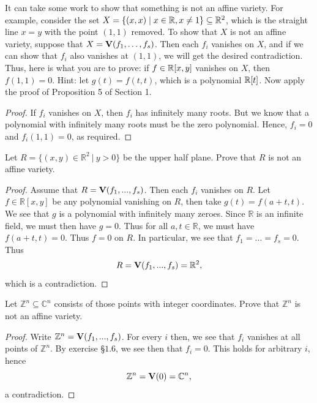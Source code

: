 \begin{exercise}{8}
It can take some work to show that something is not an affine variety. For example, consider the set $X=\{(x,x)\mid x\in\mathbb{R}, x\neq 1\}\subseteq\mathbb{R}^2$, which is the straight line $x=y$ with the point $(1,1)$ removed. To show that $X$ is not an affine variety, suppose that $X=\mathbf{V}(f_1,\dots,f_s)$. Then each $f_i$ vanishes on $X$, and if we can show that $f_i$ also vanishes at $(1,1)$, we will get the desired contradiction. Thus, here is what you are to prove: if $f\in\mathbb{R}[x,y]$ vanishes on $X$, then $f(1,1)=0$. Hint: let $g(t)=f(t,t)$, which is a polynomial $\mathbb{R}[t]$. Now apply the proof of Proposition 5 of Section 1.
\end{exercise}
\begin{proof}
 If $f_i$ vanishes on $X$, then $f_i$ has infinitely many roots. But we know that a polynomial with infinitely many roots must be the zero polynomial. Hence, $f_i=0$ and $f_i(1,1)=0$, as required.
\end{proof}

\begin{exercise}{9}
Let $R = \{(x,y)\in \mathbb{R}^2~\vert~y>0\}$ be the upper half plane. Prove that $R$ is not an affine variety.
\end{exercise}
\begin{proof}
    Assume that $R = \mathbf{V}(f_1,...,f_s)$. Then each $f_i$ vanishes on $R$. Let $f\in \mathbb{R}[x,y]$ be any polynomial vanishing on $R$, then take $g(t) = f(a+t,t)$. We see that $g$ is a polynomial with infinitely many zeroes. Since $\mathbb{R}$ is an infinite field, we must then have $g = 0$. Thus for all $a,t\in \mathbb{R}$, we must have $f(a+t,t) = 0$. Thus $f = 0$ on $R$. In particular, we see that $f_1 = ... = f_s = 0$. Thus
    $$R = \mathbf{V}(f_1,...,f_s) = \mathbb{R}^2,$$
    which is a contradiction.
\end{proof}

\begin{exercise}{10}
Let $\mathbb{Z}^n\subseteq \mathbb{C}^n$ consists of those points with integer coordinates. Prove that $\mathbb{Z}^n$ is not an affine variety.    
\end{exercise}
\begin{proof}
    Write $\mathbb{Z}^n = \mathbf{V}(f_1,...,f_s)$. For every $i$ then, we see that $f_i$ vanishes at all points of $\mathbb{Z}^n$. By exercise \S $1.6$, we see then that $f_i = 0$. This holds for arbitrary $i$, hence
    $$\mathbb{Z}^n = \mathbf{V}(0) = \mathbb{C}^n,$$
    a contradiction.
\end{proof}

